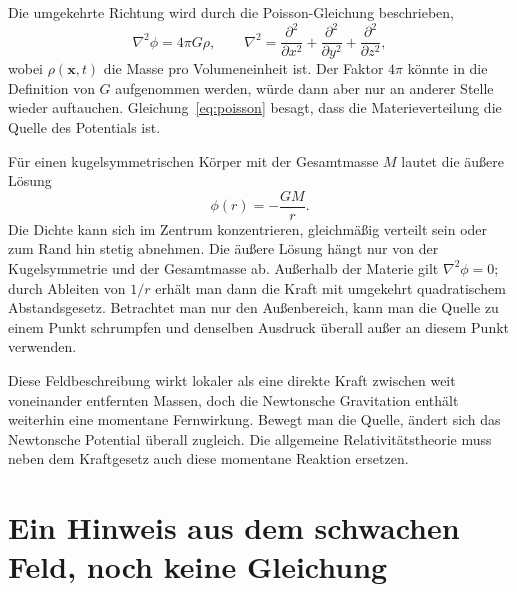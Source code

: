 Die umgekehrte Richtung wird durch die Poisson-Gleichung beschrieben,
\begin{equation}
 \nabla^2\phi=4\pi G\rho,
 \qquad
 \nabla^2=
 \frac{\partial^2}{\partial x^2}
 +\frac{\partial^2}{\partial y^2}
 +\frac{\partial^2}{\partial z^2},
 \label{eq:poisson}
\end{equation}
wobei \(\rho(\mathbf{x},t)\) die Masse pro Volumeneinheit ist. Der Faktor \(4\pi\) könnte in die Definition von \(G\) aufgenommen werden, würde dann aber nur an anderer Stelle wieder auftauchen. Gleichung~\eqref{eq:poisson} besagt, dass die Materieverteilung die Quelle des Potentials ist.

Für einen kugelsymmetrischen Körper mit der Gesamtmasse \(M\) lautet die äußere Lösung
\begin{equation}
 \phi(r)=-\frac{GM}{r}.
 \label{eq:newton-potential}
\end{equation}
Die Dichte kann sich im Zentrum konzentrieren, gleichmäßig verteilt sein oder zum Rand hin stetig abnehmen. Die äußere Lösung hängt nur von der Kugelsymmetrie und der Gesamtmasse ab. Außerhalb der Materie gilt \(\nabla^2\phi=0\); durch Ableiten von \(1/r\) erhält man dann die Kraft mit umgekehrt quadratischem Abstandsgesetz. Betrachtet man nur den Außenbereich, kann man die Quelle zu einem Punkt schrumpfen und denselben Ausdruck überall außer an diesem Punkt verwenden.

\begin{classroomqa}
\end{classroomqa}

Diese Feldbeschreibung wirkt lokaler als eine direkte Kraft zwischen weit voneinander entfernten Massen, doch die Newtonsche Gravitation enthält weiterhin eine momentane Fernwirkung. Bewegt man die Quelle, ändert sich das Newtonsche Potential überall zugleich. Die allgemeine Relativitätstheorie muss neben dem Kraftgesetz auch diese momentane Reaktion ersetzen.

\section{Ein Hinweis aus dem schwachen Feld, noch keine Gleichung}

